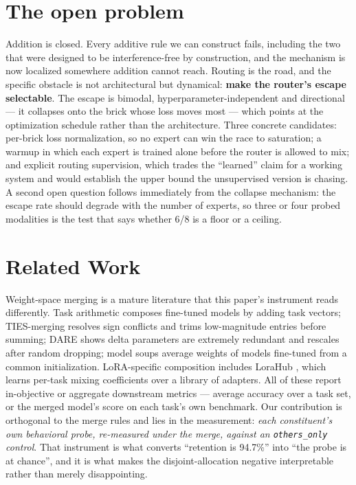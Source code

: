 \documentclass[11pt]{article}
\begin{document}
\section{The open problem}
\label{sec:open}
Addition is closed. Every additive rule we can construct fails, including the two that were designed to be interference-free by construction, and the mechanism is now localized somewhere addition cannot reach. Routing is the road, and the specific obstacle is not architectural but dynamical: \textbf{make the router's escape selectable}. The escape is bimodal, hyperparameter-independent and directional --- it collapses onto the brick whose loss moves most --- which points at the optimization schedule rather than the architecture. Three concrete candidates: per-brick loss normalization, so no expert can win the race to saturation; a warmup in which each expert is trained alone before the router is allowed to mix; and explicit routing supervision, which trades the ``learned'' claim for a working system and would establish the upper bound the unsupervised version is chasing. A second open question follows immediately from the collapse mechanism: the escape rate should degrade with the number of experts, so three or four probed modalities is the test that says whether 6/8 is a floor or a ceiling.

\section{Related Work}
Weight-space merging is a mature literature that this paper's instrument reads differently. Task arithmetic \cite{ilharco2023task} composes fine-tuned models by adding task vectors; TIES-merging \cite{yadav2023ties} resolves sign conflicts and trims low-magnitude entries before summing; DARE \cite{yu2024dare} shows delta parameters are extremely redundant and rescales after random dropping; model soups \cite{wortsman2022soups} average weights of models fine-tuned from a common initialization. LoRA-specific composition includes LoraHub \cite{huang2024lorahub}, which learns per-task mixing coefficients over a library of adapters. All of these report in-objective or aggregate downstream metrics --- average accuracy over a task set, or the merged model's score on each task's own benchmark. Our contribution is orthogonal to the merge rules and lies in the measurement: \emph{each constituent's own behavioral probe, re-measured under the merge, against an \texttt{others\_only} control}. That instrument is what converts ``retention is 94.7\%'' into ``the probe is at chance'', and it is what makes the disjoint-allocation negative interpretable rather than merely disappointing.
\end{document}
